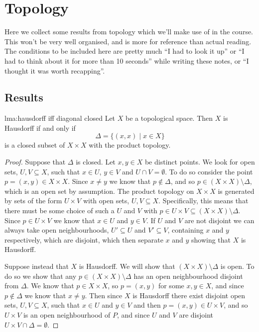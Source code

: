 \chapter{Topology}
Here we collect some results from topology which we'll make use of in the course.
This won't be very well organised, and is more for reference than actual reading.
The conditions to be included here are pretty much \enquote{I had to look it up} or \enquote{I had to think about it for more than 10 seconds} while writing these notes, or \enquote{I thought it was worth recapping}.

\section{Results}

\begin{lma}{}{lma:hausdorff iff diagonal closed}
    Let \(X\) be a topological space.
    Then \(X\) is Hausdorff if and only if
    \begin{equation}
        \Delta = \{(x, x) \mid x \in X\}
    \end{equation}
    is a closed subset of \(X \times X\) with the product topology.
    \begin{proof}
        Suppose that \(\Delta\) is closed.
        Let \(x, y \in X\) be distinct points.
        We look for open sets, \(U, V \subseteq X\), such that \(x \in U\), \(y \in V\) and \(U \cap V = \emptyset\).
        To do so consider the point \(p = (x, y) \in X \times X\).
        Since \(x \ne y\) we know that \(p \notin \Delta\), and so \(p \in (X \times X) \setminus \Delta\), which is an open set by assumption.
        The product topology on \(X \times X\) is generated by sets of the form \(U \times V\) with open sets, \(U, V \subseteq X\).
        Specifically, this means that there must be some choice of such a \(U\) and \(V\) with \(p \in U \times V \subseteq (X \times X) \setminus \Delta\).
        Since \(p \in U \times V\) we know that \(x \in U\) and \(y \in V\).
        If \(U\) and \(V\) are not disjoint we can always take open neighbourhoods, \(U' \subseteq U\) and \(V' \subseteq V\), containing \(x\) and \(y\) respectively, which are disjoint, which then separate \(x\) and \(y\) showing that \(X\) is Hausdorff.
        
        Suppose instead that \(X\) is Hausdorff.
        We will show that \((X \times X) \setminus \Delta\) is open.
        To do so we show that any \(p \in (X \times X) \setminus \Delta\) has an open neighbourhood disjoint from \(\Delta\).
        We know that \(p \in X \times X\), so \(p = (x, y)\) for some \(x, y \in X\), and since \(p \notin \Delta\) we know that \(x \ne y\).
        Then since \(X\) is Hausdorff there exist disjoint open sets, \(U, V \subseteq X\), such that \(x \in U\) and \(y \in V\) and then \(p = (x, y) \in U \times V\), and so \(U \times V\) is an open neighbourhood of \(P\), and since \(U\) and \(V\) are disjoint \(U \times V \cap \Delta = \emptyset\).
    \end{proof}
\end{lma}
